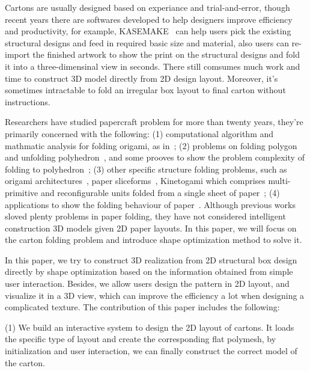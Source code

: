 \documentclass[submission]{gmp2018}
\begin{document}
Cartons are usually designed based on experiance and trial-and-error, though recent years there are softwares developed to help designers improve efficiency and productivity, for example, KASEMAKE~\cite{KASEMAKE} can help users pick the existing structural designs and feed in required basic size and material, also users can re-import the finished artwork to show the print on the structural designs and fold it into a three-dimensinal view in seconds. There still comsumes much work and time to construct 3D model directly from 2D design layout. Moreover, it's sometimes intractable to fold an irregular box layout to final carton without instructions.

Researchers have studied papercraft problem for more than twenty years, they're primarily concerned with the following: (1) computational algorithm and mathmatic analysis for folding origami, as in~\cite{Ida:2007:MOC:1802954.1803021,Lang:1996:CAO:237218.237249,xl-idetc-14}; (2) problems on folding polygon and unfolding polyhedron~\cite{Bern:2003:UPC:636968.636970,O'Rourke:1998:FUC:646319.686376,Rourke2008Unfolding}, and some prooves to show the problem complexity of folding to polyhedron~\cite{Biedl:2005:NFP:1090462.1646553,Biedl2004When,Lubiw1996When}; (3) other specific structure folding problems, such as origami architectures~\cite{Le:2014:SCO:2574223.2574468,Li:2011:GSV:1964921.1964993,Li:2010:PAP:1833349.1778848,Ruiz:2013:GMP:2542355.2542360}, paper sliceforms~\cite{Le-Nguyen:2013:APS:2553684.2553686,McCrae:2011:SSB:2070781.2024202,Schwartzburg13}, Kinetogami which comprises multi-primitive and reconfigurable units folded from a single sheet of paper~\cite{Gao2013Kinetogami}; (4) applications to show the folding behaviour of paper~\cite{Thiel1998,Kishi:1998:OFP:786112.786279,Nimnual2007Virtual,Shimanuki2009Construction}. Although previous works sloved plenty problems in paper folding, they have not considered intelligent construction 3D models given 2D paper layouts. In this paper, we will focus on the carton folding problem and introduce shape optimization method to solve it.

In this paper, we try to construct 3D realization from 2D structural box design directly by shape optimization based on the information obtained from simple user interaction.  Besides, we allow users design the pattern in 2D layout, and visualize it in a 3D view, which can improve the efficiency a lot when designing a complicated texture. The contribution of this paper includes the following:

(1) We build an interactive system to design the 2D layout of cartons. It loads the specific type of layout and create the corresponding flat polymesh, by initialization and user interaction, we can finally construct the correct model of the carton.
\end{document}
